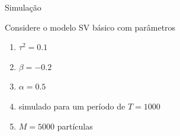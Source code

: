 \documentclass{beamer}
\begin{document}
%
%


\begin{frame}{Simulação}

Considere o modelo SV básico com parâmetros 
\begin{enumerate}
\item $\tau^2=0.1$
\item $\beta=-0.2$ 
\item $\alpha=0.5$ 
\item simulado para um período de $T=1000$
\item $M=5000$ partículas
\end{enumerate}


\end{frame}
\end{document}
